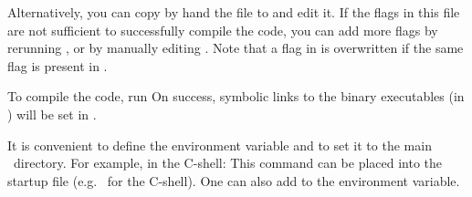 Alternatively, you can copy by hand the file
 to  and edit it. If the
flags in this file are not sufficient to successfully compile the code,
you can add more flags by rerunning , or by
manually editing . Note that a flag in
 is overwritten if the same flag is present in
.


To compile the code, run
%
%
On success, symbolic links to the binary executables (in ) will be
set in .

It is convenient to define the environment variable 
and to set it to the main
\CosmoPMC\ directory. For example, in the C-shell:
%
%
This command can be placed into the startup file
(e.g.~ for the C-shell).
One can also add  to
the  environment variable.

